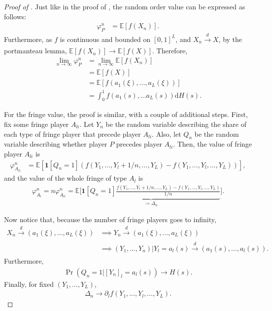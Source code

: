 \documentclass[a4paper]{article}
\newcommand{\E}{\mathbb{E}}
\begin{document}
\begin{proof}[Proof of ]
    Just like in the proof of , the random order value can be expressed as follows:
    \begin{align*}
        \varphi_P^n &= \E[f(X_n)].
    \end{align*}
    Furthermore, as $f$ is continuous and bounded on $[0, 1]^L$, and $X_n \xrightarrow[]{d} X$, by the portmanteau lemma, $\E[f(X_n)] \to \E[f(X)]$.
    Therefore,
    \begin{align*}
        \lim_{n \to \infty} \varphi_P^n &= \lim_{n \to \infty} \E[f(X_n)] \\
        &= \E[f(X)] \\
        &= \E[f(a_1(\xi), \dots, a_L(\xi))] \\
        &= \int_0^1 f(a_1(s), \dots a_L(s)) \mathrm{d}H(s).
    \end{align*}

    For the fringe value, the proof is similar, with a couple of additional steps.
    First, fix some fringe player $A_{li}$.
    Let $Y_n$ be the random variable describing the share of each type of fringe player that precede player $A_{li}$.
    Also, let $Q_n$ be the random variable describing whether player $P$ precedes player $A_{li}$.
    Then, the value of fringe player $A_{li}$ is
    \begin{align*}
        \varphi_{A_{li}}^n &= \E[ \mathbf{1}[Q_n = 1] (f(Y_1, \dots, Y_l + 1/n, \dots, Y_L) - f(Y_1, \dots, Y_l, \dots, Y_L)) ],
    \end{align*}
    and the value of the whole fringe of type $A_l$ is
    \begin{align*}
        \varphi_{A_{l}}^n = n \varphi_{A_{li}}^n = \E \bigg[ \underbrace{\mathbf{1}[Q_n = 1] \frac{f(Y_1, \dots, Y_l + 1/n, \dots, Y_L) - f(Y_1, \dots, Y_l, \dots, Y_L)}{1/n}}_{\coloneqq \Delta_n} \bigg].
    \end{align*}

    Now notice that, because the number of fringe players goes to infinity,
    \begin{align*}
        X_n \xrightarrow[]{d} (a_1(\xi), \dots, a_L(\xi)) &\implies Y_n \xrightarrow[]{d} (a_1(\xi), \dots, a_L(\xi)) \\
        &\implies (Y_1, \dots, Y_n) | Y_l = a_l(s) \xrightarrow[]{d} (a_1(s), \dots, a_l(s)) .
    \end{align*}
    Furthermore,
    \begin{align*}
        \Pr(Q_n = 1 | [Y_n]_l = a_l(s)) \to H(s).
    \end{align*}
    Finally, for fixed $(Y_1, \dots, Y_L)$,
    \begin{align*}
        \Delta_n \to \partial_l f(Y_1, \dots, Y_l, \dots, Y_L).
    \end{align*}
    

\end{proof}
\end{document}
